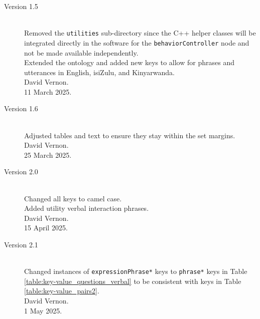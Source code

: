 \documentclass{CSSRforAfrica}
\begin{document}
\begin{description}
\item [Version 1.5]~\\
Removed  the {\small \tt utilities} sub-directory since the C++ helper classes will be integrated directly in the software for the {\small \tt behaviorController} node and not be made available independently.\\
Extended the ontology and added new keys to allow for phrases and utterances in English, isiZulu, and Kinyarwanda.\\
David Vernon.\\
11 March 2025.   \\   

\item [Version 1.6]~\\
Adjusted tables and text to ensure they stay within the set margins.\\
David Vernon.\\
25 March 2025.   \\  

\item [Version 2.0]~\\
Changed all keys to camel case.\\
Added utility verbal interaction phrases.\\
David Vernon.\\
15 April 2025.   \\  

\item [Version 2.1]~\\
Changed instances of {\small \tt expressionPhrase*} keys to {\small \tt phrase*} keys in Table \ref{table:key-value_questions_verbal} to be consistent with keys in Table \ref{table:key-value_pairs2}.\\
David Vernon.\\
1 May 2025.   \\  

\end{description}
\end{document}
